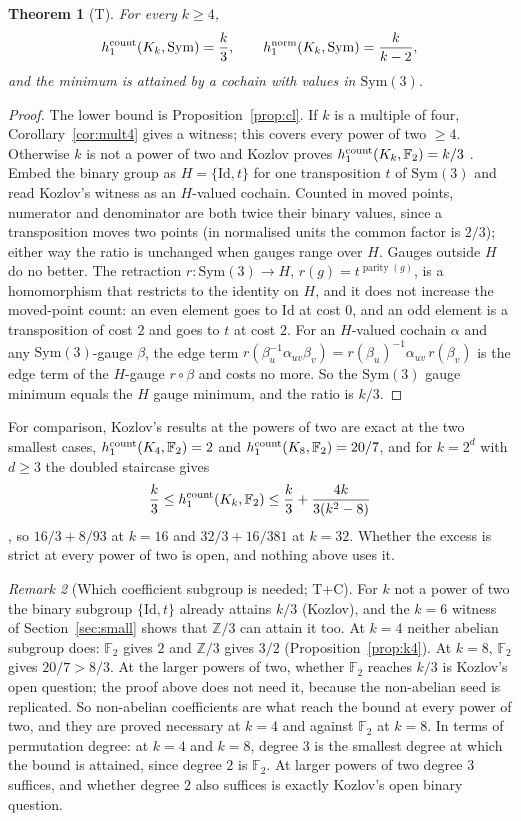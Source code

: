 \documentclass[11pt]{article}
\newtheorem{theorem}{Theorem}\newtheorem{proposition}[theorem]{Proposition}\newtheorem{corollary}[theorem]{Corollary}
\theoremstyle{remark}\newtheorem{remark}[theorem]{Remark}
\newcommand{\Sym}{\mathrm{Sym}}\newcommand{\dH}{d_H}\newcommand{\F}{\mathbb{F}}\newcommand{\Z}{\mathbb{Z}}
\newcommand{\Id}{\mathrm{Id}}\newcommand{\Tr}{\operatorname{Tr}}
\begin{document}
\begin{theorem}[T]\label{thm:all}
For every $k\ge4$,
\[
h_1^{\rm count}(K_k,\Sym)=\frac k3,\qquad h_1^{\rm norm}(K_k,\Sym)=\frac{k}{k-2},
\]
and the minimum is attained by a cochain with values in $\Sym(3)$.
\end{theorem}
\begin{proof}
The lower bound is Proposition~\ref{prop:cl}. If $k$ is a multiple of four, Corollary~\ref{cor:mult4} gives a witness; this covers every power of two $\ge4$. Otherwise $k$ is not a power of two and Kozlov proves $h_1^{\rm count}(K_k,\F_2)=k/3$ \cite[Thm.~4.2, Cor.~4.3]{Koz}. Embed the binary group as $H=\{\Id,t\}$ for one transposition $t$ of $\Sym(3)$ and read Kozlov's witness as an $H$-valued cochain. Counted in moved points, numerator and denominator are both twice their binary values, since a transposition moves two points (in normalised units the common factor is $2/3$); either way the ratio is unchanged when gauges range over $H$. Gauges outside $H$ do no better. The retraction $r:\Sym(3)\to H$, $r(g)=t^{\operatorname{parity}(g)}$, is a homomorphism that restricts to the identity on $H$, and it does not increase the moved-point count: an even element goes to $\Id$ at cost $0$, and an odd element is a transposition of cost $2$ and goes to $t$ at cost $2$. For an $H$-valued cochain $\alpha$ and any $\Sym(3)$-gauge $\beta$, the edge term $r(\beta_u^{-1}\alpha_{uv}\beta_v)=r(\beta_u)^{-1}\alpha_{uv}\,r(\beta_v)$ is the edge term of the $H$-gauge $r\circ\beta$ and costs no more. So the $\Sym(3)$ gauge minimum equals the $H$ gauge minimum, and the ratio is $k/3$.
\end{proof}
For comparison, Kozlov's results at the powers of two are exact at the two smallest cases, $h_1^{\rm count}(K_4,\F_2)=2$ and $h_1^{\rm count}(K_8,\F_2)=20/7$, and for $k=2^d$ with $d\ge3$ the doubled staircase gives
\[
\frac k3\le h_1^{\rm count}(K_k,\F_2)\le\frac k3+\frac{4k}{3(k^2-8)}
\]
\cite[Thm.~4.6]{Koz}, so $16/3+8/93$ at $k=16$ and $32/3+16/381$ at $k=32$. Whether the excess is strict at every power of two is open, and nothing above uses it.

\begin{remark}[Which coefficient subgroup is needed; T+C]
For $k$ not a power of two the binary subgroup $\{\Id,t\}$ already attains $k/3$ (Kozlov), and the $k=6$ witness of Section~\ref{sec:small} shows that $\Z/3$ can attain it too. At $k=4$ neither abelian subgroup does: $\F_2$ gives $2$ and $\Z/3$ gives $3/2$ (Proposition~\ref{prop:k4}). At $k=8$, $\F_2$ gives $20/7>8/3$. At the larger powers of two, whether $\F_2$ reaches $k/3$ is Kozlov's open question; the proof above does not need it, because the non-abelian seed is replicated. So non-abelian coefficients are what reach the bound at every power of two, and they are proved necessary at $k=4$ and against $\F_2$ at $k=8$. In terms of permutation degree: at $k=4$ and $k=8$, degree $3$ is the smallest degree at which the bound is attained, since degree $2$ is $\F_2$. At larger powers of two degree $3$ suffices, and whether degree $2$ also suffices is exactly Kozlov's open binary question.
\end{remark}
\end{document}
